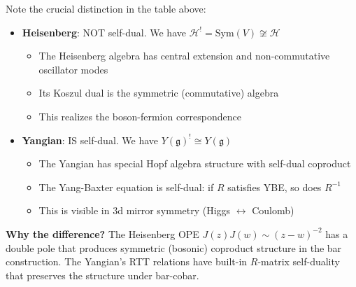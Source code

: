 \begin{remark}\label{rem:heisenberg-yangian-contrast}
Note the crucial distinction in the table above:
\begin{itemize}
\item \textbf{Heisenberg}: NOT self-dual. We have $\mathcal{H}^! = \text{Sym}(V) \not\cong \mathcal{H}$
   \begin{itemize}
   \item The Heisenberg algebra has central extension and non-commutative oscillator modes
   \item Its Koszul dual is the symmetric (commutative) algebra
   \item This realizes the boson-fermion correspondence
   \end{itemize}

\item \textbf{Yangian}: IS self-dual. We have $Y(\mathfrak{g})^! \cong Y(\mathfrak{g})$
   \begin{itemize}
   \item The Yangian has special Hopf algebra structure with self-dual coproduct
   \item The Yang-Baxter equation is self-dual: if $R$ satisfies YBE, so does $R^{-1}$
   \item This is visible in 3d mirror symmetry (Higgs $\leftrightarrow$ Coulomb)
   \end{itemize}
\end{itemize}

\textbf{Why the difference?} The Heisenberg OPE $J(z)J(w) \sim (z-w)^{-2}$ has a double pole that produces symmetric (bosonic) coproduct structure in the bar construction. The Yangian's RTT relations have built-in $R$-matrix self-duality that preserves the structure under bar-cobar.
\end{remark}

